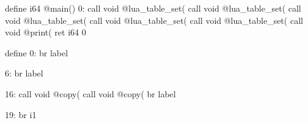 define i64 @main() {
0:
	call void @lua_table_set(%
	call void @lua_table_set(%
	call void @lua_table_set(%
	call void @lua_table_set(%
	call void @lua_table_set(%
	call void @print(%
	ret i64 0
}

define %
0:
	br label %

6:
	br label %

16:
	call void @copy(%
	call void @copy(%
	br label %

19:
	br i1 %

